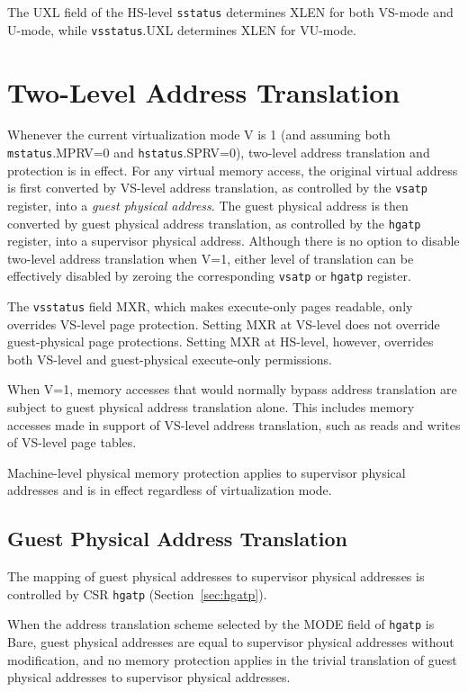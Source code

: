 The UXL field of the HS-level {\tt sstatus} determines XLEN for both
VS-mode and U-mode, while {\tt vsstatus}.UXL determines XLEN for
VU-mode.

\section{Two-Level Address Translation}
\label{sec:two-level-translation}

Whenever the current virtualization mode V is 1 (and assuming both
{\tt mstatus}.MPRV=0 and {\tt hstatus}.SPRV=0), two-level address translation
and protection is in effect.
For any virtual memory access, the original virtual address is first converted
by VS-level address translation, as controlled by the {\tt vsatp}
register, into a {\em guest physical address}.
The guest physical address is then converted by guest physical address
translation, as controlled by the {\tt hgatp} register, into a supervisor
physical address.
Although there is no option to disable two-level address translation when V=1,
either level of translation can be effectively disabled by zeroing the
corresponding {\tt vsatp} or {\tt hgatp} register.

The {\tt vsstatus} field MXR, which makes execute-only pages readable, only
overrides VS-level page protection.
Setting MXR at VS-level does not override guest-physical page protections.
Setting MXR at HS-level, however, overrides both VS-level and guest-physical
execute-only permissions.

When V=1, memory accesses that would normally bypass address translation are
subject to guest physical address translation alone.
This includes memory accesses made in support of VS-level address translation,
such as reads and writes of VS-level page tables.

Machine-level physical memory protection applies to supervisor physical
addresses and is in effect regardless of virtualization mode.

\subsection{Guest Physical Address Translation}
\label{sec:guest-addr-translation}

The mapping of guest physical addresses to supervisor physical addresses is
controlled by CSR {\tt hgatp} (Section~\ref{sec:hgatp}).

When the address translation scheme selected by the MODE field of {\tt hgatp}
is Bare, guest physical addresses are equal to supervisor physical addresses
without modification, and no memory protection applies in the trivial
translation of guest physical addresses to supervisor physical addresses.

